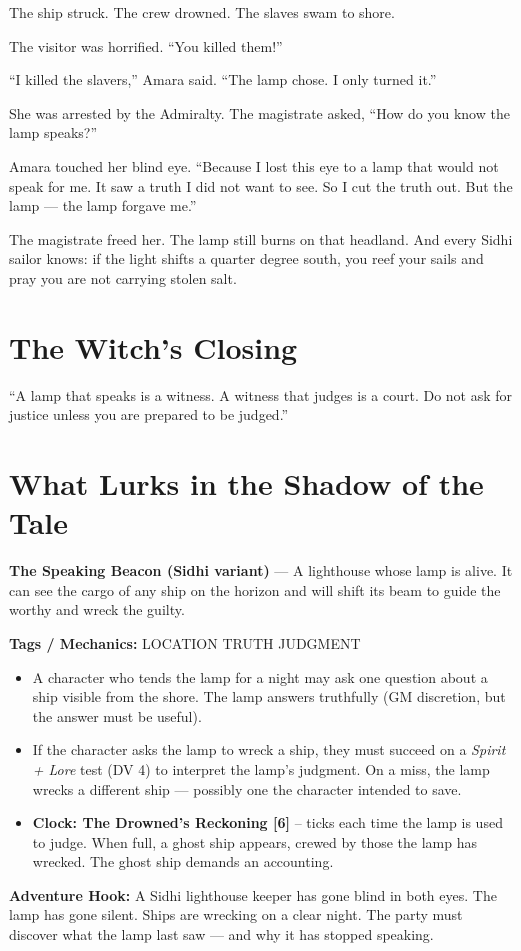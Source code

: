 \documentclass[10pt,twoside]{book}
\newcommand{\tag}[1]{\textsc{#1}}
\begin{document}
The ship struck. The crew drowned. The slaves swam to shore.

The visitor was horrified. ``You killed them!''

``I killed the slavers,'' Amara said. ``The lamp chose. I only turned it.''

She was arrested by the Admiralty. The magistrate asked, ``How do you know the lamp speaks?''

Amara touched her blind eye. ``Because I lost this eye to a lamp that would not speak for me. It saw a truth I did not want to see. So I cut the truth out. But the lamp --- the lamp forgave me.''

The magistrate freed her. The lamp still burns on that headland. And every Sidhi sailor knows: if the light shifts a quarter degree south, you reef your sails and pray you are not carrying stolen salt.

\section*{The Witch's Closing}
``A lamp that speaks is a witness. A witness that judges is a court. Do not ask for justice unless you are prepared to be judged.''

\section*{What Lurks in the Shadow of the Tale}
\begin{infobox}
\textbf{The Speaking Beacon (Sidhi variant)} --- A lighthouse whose lamp is alive. It can see the cargo of any ship on the horizon and will shift its beam to guide the worthy and wreck the guilty.

\textbf{Tags / Mechanics:} \tag{LOCATION} \tag{TRUTH} \tag{JUDGMENT}

\begin{itemize}
\item A character who tends the lamp for a night may ask one question about a ship visible from the shore. The lamp answers truthfully (GM discretion, but the answer must be useful).
\item If the character asks the lamp to wreck a ship, they must succeed on a \textit{Spirit + Lore} test (DV 4) to interpret the lamp's judgment. On a miss, the lamp wrecks a different ship --- possibly one the character intended to save.
\item \textbf{Clock: The Drowned's Reckoning [6]} -- ticks each time the lamp is used to judge. When full, a ghost ship appears, crewed by those the lamp has wrecked. The ghost ship demands an accounting.
\end{itemize}

\textbf{Adventure Hook:} A Sidhi lighthouse keeper has gone blind in both eyes. The lamp has gone silent. Ships are wrecking on a clear night. The party must discover what the lamp last saw --- and why it has stopped speaking.
\end{infobox}
\end{document}
